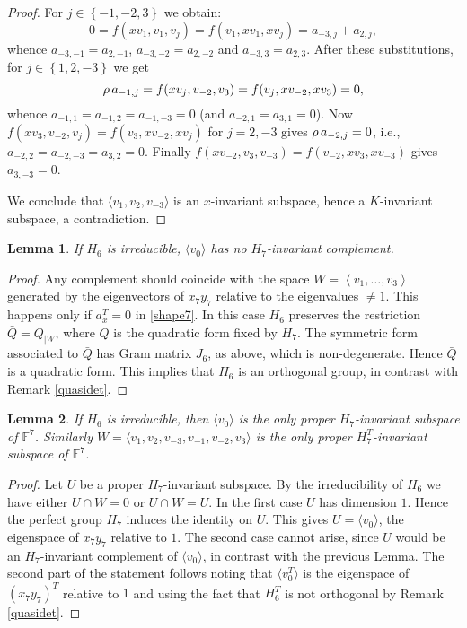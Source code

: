 \documentclass{amsart}
\newtheorem{lemma}{Lemma}[section]
\theoremstyle{remark}
\begin{document}
\begin{proof}
For $j\in \left\{-1, -2,3\right\}$ we obtain:
$$0 = f(x v_1,  v_1, v_j)=f(v_1, x v_1, x v_j)=a_{-3,j}+ a_{2,j},$$
whence $a_{-3,-1}=a_{2,-1}$,  $a_{-3,-2}=a_{2,-2}$ and  $a_{-3,3}=a_{2,3}$. 
After these substitutions, for $j\in \left\{1, 2,-3\right\}$ we get
$$
\rho\thinspace a_{-1,j}=f( x v_j, v_{-2}, v_3) = f( v_j, x v_{-2}, x v_3) =0,$$
whence $a_{-1,1}=a_{-1,2}=a_{-1,-3}=0$ (and $a_{-2,1}=a_{3,1}=0$).
Now $f(x v_3, v_{-2}, v_j)=f(v_3,  xv_{-2},  x v_j) $ for $j=2,-3$
gives 
$\rho\thinspace a_{-2,j}=0$, i.e., $a_{-2,2}=a_{-2,-3}=a_{3,2}=0$. Finally  
$f( x v_{-2}, v_{3}, v_{-3})=f(v_{-2},  xv_{3},  x v_{-3})$ gives $a_{3,-3}=0$.

We conclude that $\langle v_1,v_2,v_{-3} \rangle$  is an $x$-invariant subspace,
hence a $K$-invariant subspace, a contradiction.
\end{proof}

\begin{lemma}\label{orto} 
If $H_6$ is  irreducible, $\langle v_0\rangle$
has no $H_7$-invariant complement.
\end{lemma}

\begin{proof}
Any complement should coincide with the space $W=\left\langle v_1, \dots , v_{3}\right\rangle$
generated by the eigenvectors of $x_7y_7$ relative to the eigenvalues $\ne 1$. 
This happens only if $a_{x}^T =0$ in \eqref{shape7}. In this case $H_6$ preserves 
the restriction $\bar Q=Q_{|W}$, where $Q$ is the quadratic form fixed by $H_7$.
The symmetric form associated to $\bar Q$ has Gram matrix $J_6$, as above,
which is non-degenerate.
Hence $\bar Q$ is a quadratic form.
This implies that $H_6$ is an orthogonal group, in contrast with Remark \ref{quasidet}.
\end{proof}

\begin{lemma}\label{invSub}
If $H_6$ is irreducible, then $\langle v_0\rangle$ is the only proper $H_7$-invariant subspace
of ${\mathbb{F}}^7$. Similarly $W=\langle v_{1}, v_{2}, v_{-3}, v_{-1}, v_{-2}, v_3\rangle$ is the
only proper
$H_7^T$-invariant subspace
of ${\mathbb{F}}^7$.
\end{lemma}

\begin{proof}
Let $U$ be a proper $H_7$-invariant subspace.
By the irreducibility of $H_6$ we have either $U\cap W=0$
or  $U\cap W=U$. In the first case $U$ has
dimension $1$.
Hence the perfect group $H_7$ induces the identity on $U$. This gives  $U=\langle
v_0\rangle$,
the eigenspace of $x_7y_7$ relative to $1$. The second case cannot arise, since $U$ would be an
$H_7$-invariant complement of $\langle v_0\rangle$, in contrast with the previous Lemma.
The second part of the statement follows noting that $\langle v_0^T\rangle$ is the
eigenspace 
of $(x_7y_7)^T$ relative to $1$ and using the fact that $H_6^T$ is not orthogonal by Remark 
\ref{quasidet}.
\end{proof}
\end{document}
